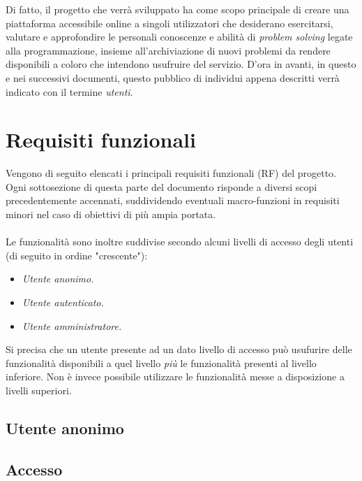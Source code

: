 \documentclass[11pt, a4paper]{article}
\theoremstyle{definition}
\begin{document}
Di fatto, il progetto che verrà sviluppato ha come scopo principale di
creare una piattaforma accessibile online a singoli utilizzatori che
desiderano esercitarsi, valutare e approfondire le personali
conoscenze e abilità di \textit{problem solving} legate alla programmazione,
insieme all'archiviazione di nuovi problemi da rendere disponibili a coloro
che intendono usufruire del servizio.
D'ora in avanti, in questo e nei successivi documenti, questo pubblico di
individui appena descritti verrà indicato con il termine \textit{utenti}.

\newpage
\section{Requisiti funzionali}
Vengono di seguito elencati i principali requisiti funzionali (RF)
del progetto. Ogni sottosezione di questa parte del documento
risponde a diversi scopi precedentemente accennati, suddividendo
eventuali macro-funzioni in requisiti minori nel caso di obiettivi
di più ampia portata.
\\\\
\noindent Le funzionalità sono inoltre suddivise secondo alcuni livelli di accesso
degli utenti (di seguito in ordine "crescente"):
\begin{itemize}
    \item \textit{Utente anonimo.}
    \item \textit{Utente autenticato.}
    \item \textit{Utente amministratore.}
\end{itemize}
Si precisa che un utente presente ad un dato livello di accesso può usufurire
delle funzionalità disponibili a quel livello \textit{più} le funzionalità
presenti al livello inferiore. Non è invece possibile utilizzare le funzionalità
messe a disposizione a livelli superiori.

\begin{center}
\section*{Utente anonimo}    
\end{center}


\subsection{Accesso}
\end{document}
